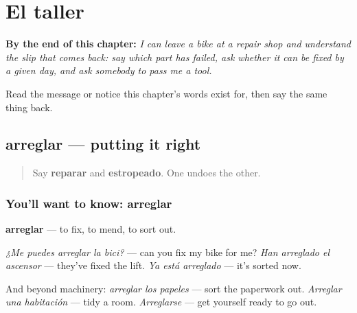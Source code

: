 
\chapter{El taller}
\label{ch:es-taller}

\begin{chapteropening}
\textbf{By the end of this chapter:} \emph{I can leave a bike at a repair shop and understand the slip that comes back: say which part has failed, ask whether it can be fixed by a given day, and ask somebody to pass me a tool.}

Read the message or notice this chapter's words exist for, then say the same thing back.
\end{chapteropening}

\section[arreglar]{arreglar — putting it right}

\label{lesson:ES-C449-arreglar}



\begin{quote}
Say \textbf{reparar} and \textbf{estropeado}. One undoes the other.
\end{quote}

\subsection*{You'll want to know: arreglar}
\textbf{arreglar} — to fix, to mend, to sort out.

\emph{¿Me puedes arreglar la bici?} — can you fix my bike for me? \emph{Han arreglado el ascensor} — they've fixed the lift. \emph{Ya está arreglado} — it's sorted now.

And beyond machinery: \emph{arreglar los papeles} — sort the paperwork out. \emph{Arreglar una habitación} — tidy a room. \emph{Arreglarse} — get yourself ready to go out.

